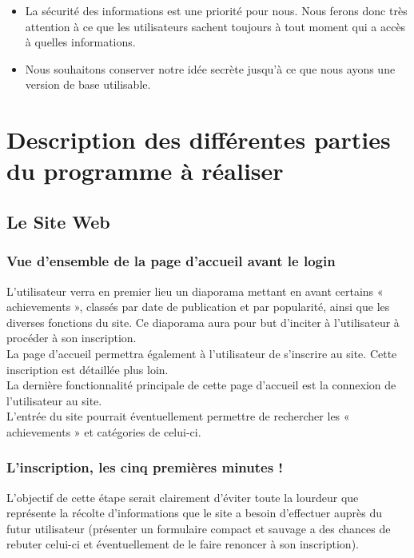 \documentclass{life-fr}
\begin{document}
\begin{itemize}
  \item La sécurité des informations est une priorité pour nous. Nous ferons donc très attention à ce que les utilisateurs sachent toujours à tout moment qui a accès à quelles informations.
  \item Nous souhaitons conserver notre idée secrète jusqu’à ce que nous ayons une version de base utilisable.
\end{itemize}

\chapter{Description des différentes parties du programme à réaliser}

\section{Le Site Web}

\subsection{Vue d'ensemble de la page d'accueil avant le login}

L'utilisateur verra en premier lieu un diaporama mettant en avant certains « achievements », classés par date de publication et par popularité, ainsi que les diverses fonctions du site. Ce diaporama aura pour but d'inciter à l'utilisateur à procéder à son inscription.\\

La page d'accueil permettra également à l'utilisateur de s'inscrire au site. Cette inscription est détaillée plus loin.\\

La dernière fonctionnalité principale de cette page d'accueil est la connexion de l'utilisateur au site.\\

L'entrée du site pourrait éventuellement permettre de rechercher les « achievements » et catégories de celui-ci.

\subsection{L'inscription, les cinq premières minutes !}

L'objectif de cette étape serait clairement d'éviter toute la lourdeur que représente la récolte d'informations que le site a besoin d'effectuer auprès du futur utilisateur (présenter un formulaire compact et sauvage a des chances de rebuter celui-ci et éventuellement de le faire renoncer à son inscription).\\
\end{document}
